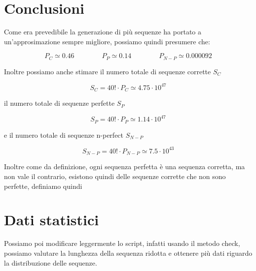 \documentclass[a4paper]{article}
\begin{document}
\newpage

\section{Conclusioni}

Come era prevedibile la generazione di più sequenze ha portato a un'approsimazione sempre migliore, possiamo quindi presumere che:

\begin{equation*}
    P_C \simeq 0.46
    \qquad
    \qquad
    P_P \simeq 0.14
    \qquad
    \qquad
    P_{N-P} \simeq 0.000092
\end{equation*}

\vspace{0.5cm}
\noindent
Inoltre possiamo anche stimare il numero totale di sequenze corrette $S_C$

\begin{equation*}
    S_C  = 40! \cdot P_C \simeq 4.75 \cdot 10^{47}
\end{equation*}

\vspace{0.5cm}
\noindent
il numero totale di sequenze perfette $S_P$

\begin{equation*}
    S_P  = 40! \cdot P_P \simeq 1.14 \cdot 10^{47}
\end{equation*}

\vspace{0.5cm}
\noindent
e il numero totale di sequenze n-perfect $S_{N-P}$

\begin{equation*}
    S_{N-P}  = 40! \cdot P_{N-P} \simeq 7.5 \cdot 10^{43}
\end{equation*}

\vspace{0.5cm}
\noindent
Inoltre come da definizione, ogni sequenza perfetta è una sequenza corretta, ma non vale il contrario, esistono quindi delle sequenze corrette che non sono perfette, definiamo quindi

\newpage

\section{Dati statistici}
Possiamo poi modificare leggermente lo script, infatti usando il metodo check, possiamo valutare la lunghezza della sequenza ridotta e ottenere più dati riguardo la distribuzione delle sequenze.
\end{document}
